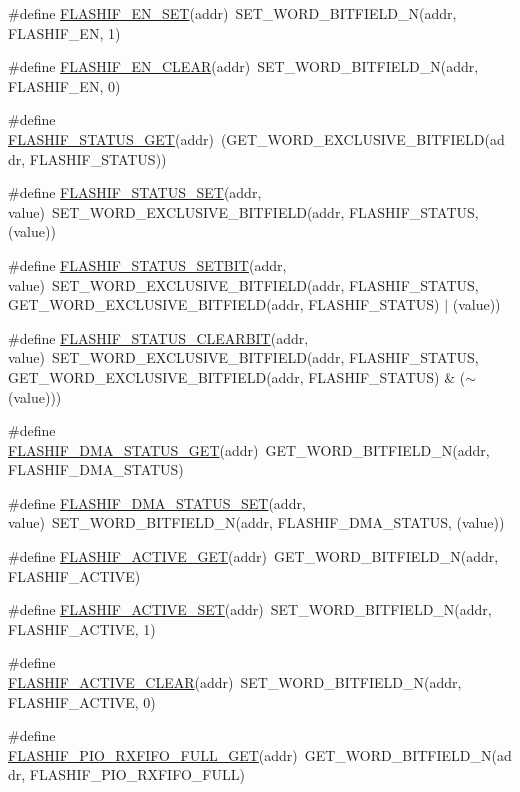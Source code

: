 \begin{DoxyCompactItemize}
\item 
\#define \hyperlink{a00551_ae9aa9b45cb670526041e05f842f7cced}{FLASHIF\_\-EN\_\-SET}(addr)~SET\_\-WORD\_\-BITFIELD\_\-N(addr, FLASHIF\_\-EN, 1)
\item 
\#define \hyperlink{a00551_ae9af5bba876e9704ee0d3aee7edf2cba}{FLASHIF\_\-EN\_\-CLEAR}(addr)~SET\_\-WORD\_\-BITFIELD\_\-N(addr, FLASHIF\_\-EN, 0)
\item 
\#define \hyperlink{a00551_ab20b6f8c5d65e67e8010320915135e09}{FLASHIF\_\-STATUS\_\-GET}(addr)~(GET\_\-WORD\_\-EXCLUSIVE\_\-BITFIELD(addr, FLASHIF\_\-STATUS))
\item 
\#define \hyperlink{a00551_aa4860812dc206966ed6ebda07b45df2d}{FLASHIF\_\-STATUS\_\-SET}(addr, value)~SET\_\-WORD\_\-EXCLUSIVE\_\-BITFIELD(addr, FLASHIF\_\-STATUS, (value))
\item 
\#define \hyperlink{a00551_a9cdf0e2b4a60cba19d1ca7813dd3c9ce}{FLASHIF\_\-STATUS\_\-SETBIT}(addr, value)~SET\_\-WORD\_\-EXCLUSIVE\_\-BITFIELD(addr, FLASHIF\_\-STATUS, GET\_\-WORD\_\-EXCLUSIVE\_\-BITFIELD(addr, FLASHIF\_\-STATUS) $|$ (value))
\item 
\#define \hyperlink{a00551_a1f5769b621ba509fdd57dd45f4d8e8f6}{FLASHIF\_\-STATUS\_\-CLEARBIT}(addr, value)~SET\_\-WORD\_\-EXCLUSIVE\_\-BITFIELD(addr, FLASHIF\_\-STATUS, GET\_\-WORD\_\-EXCLUSIVE\_\-BITFIELD(addr, FLASHIF\_\-STATUS) \& ($\sim$(value)))
\item 
\#define \hyperlink{a00551_a02e3c99498752faf6d7f391a0be0810a}{FLASHIF\_\-DMA\_\-STATUS\_\-GET}(addr)~GET\_\-WORD\_\-BITFIELD\_\-N(addr, FLASHIF\_\-DMA\_\-STATUS)
\item 
\#define \hyperlink{a00551_af2399342aac0b35437e3d28bd7b94b71}{FLASHIF\_\-DMA\_\-STATUS\_\-SET}(addr, value)~SET\_\-WORD\_\-BITFIELD\_\-N(addr, FLASHIF\_\-DMA\_\-STATUS, (value))
\item 
\#define \hyperlink{a00551_a6c6c045c0556c7d2cbc545c4cab88783}{FLASHIF\_\-ACTIVE\_\-GET}(addr)~GET\_\-WORD\_\-BITFIELD\_\-N(addr, FLASHIF\_\-ACTIVE)
\item 
\#define \hyperlink{a00551_a04a5ca88717a75042784e081a3f11e0c}{FLASHIF\_\-ACTIVE\_\-SET}(addr)~SET\_\-WORD\_\-BITFIELD\_\-N(addr, FLASHIF\_\-ACTIVE, 1)
\item 
\#define \hyperlink{a00551_a8887722af6d67723b420ab7e7418ecb3}{FLASHIF\_\-ACTIVE\_\-CLEAR}(addr)~SET\_\-WORD\_\-BITFIELD\_\-N(addr, FLASHIF\_\-ACTIVE, 0)
\item 
\#define \hyperlink{a00551_afdbfb8927827181fa6d0dff54764db0e}{FLASHIF\_\-PIO\_\-RXFIFO\_\-FULL\_\-GET}(addr)~GET\_\-WORD\_\-BITFIELD\_\-N(addr, FLASHIF\_\-PIO\_\-RXFIFO\_\-FULL)

\end{DoxyCompactItemize}
